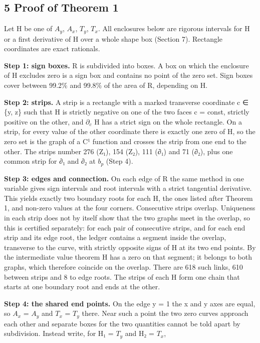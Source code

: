 \documentclass[
  11pt,
]{article}
\begin{document}
\subsection{5 Proof of Theorem 1}

Let H be one of \(A_{y}\), \(A_{x}\), \(T_{y}\), \(T_{x}\). All
enclosures below are rigorous intervals for H or a first derivative of H
over a whole shape box (Section 7). Rectangle coordinates are exact
rationals.

\textbf{Step 1: sign boxes.} R is subdivided into boxes. A box on which
the enclosure of H excludes zero is a sign box and contains no point of
the zero set. Sign boxes cover between 99.2\% and 99.8\% of the area of
R, depending on H.

\textbf{Step 2: strips.} A strip is a rectangle with a marked transverse
coordinate c ∈ \{y, z\} such that H is strictly negative on one of the
two faces c = const, strictly positive on the other, and
\(\partial_{c}\) H has a strict sign on the whole rectangle. On a strip,
for every value of the other coordinate there is exactly one zero of H,
so the zero set is the graph of a C¹ function and crosses the strip from
one end to the other. The strips number 276 (Z₁), 154 (Z₂), 111 (∂₁) and
71 (∂₂), plus one common strip for ∂₁ and ∂₂ at \(b_{p}\) (Step 4).

\textbf{Step 3: edges and connection.} On each edge of R the same method
in one variable gives sign intervals and root intervals with a strict
tangential derivative. This yields exactly two boundary roots for each
H, the ones listed after Theorem 1, and non-zero values at the four
corners. Consecutive strips overlap. Uniqueness in each strip does not
by itself show that the two graphs meet in the overlap, so this is
certified separately: for each pair of consecutive strips, and for each
end strip and its edge root, the ledger contains a segment inside the
overlap, transverse to the curve, with strictly opposite signs of H at
its two end points. By the intermediate value theorem H has a zero on
that segment; it belongs to both graphs, which therefore coincide on the
overlap. There are 618 such links, 610 between strips and 8 to edge
roots. The strips of each H form one chain that starts at one boundary
root and ends at the other.

\textbf{Step 4: the shared end points.} On the edge y = 1 the x and y
axes are equal, so \(A_{x}\) = \(A_{y}\) and \(T_{x}\) = \(T_{y}\)
there. Near such a point the two zero curves approach each other and
separate boxes for the two quantities cannot be told apart by
subdivision. Instead write, for H₁ = \(T_{y}\) and H₂ = \(T_{x}\),
\end{document}
